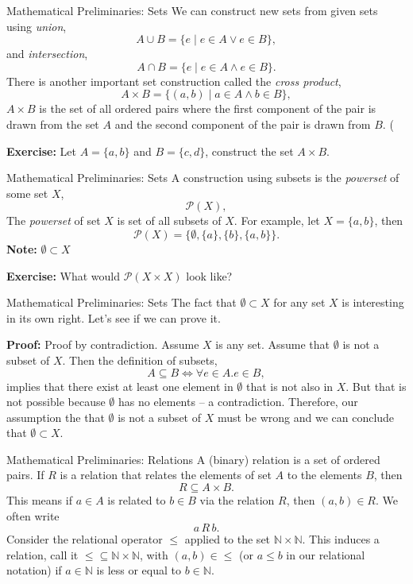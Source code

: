 \documentclass{beamer}
\begin{document}
\begin{frame}{\large Mathematical  Preliminaries: Sets}
We can construct new sets from given sets using {\em union},
\[
A \cup B = \{ e \mid e\in A \vee e \in B\},
\]
 and {\em intersection},
\[
A \cap B = \{ e \mid  e\in A \wedge e \in B\}.
\]
There is another important set construction called the {\em cross product},
\[
A\times B = \{ (a,b) \mid  a\in A \wedge b\in B\},
\]
$A\times B$ is the set of all ordered pairs where the first component of the pair is drawn from
the set $A$ and the second component of the pair is drawn from $B$. (

{\bf Exercise:} Let $A=\{a,b\}$ and $B=\{c,d\}$, construct the set $A\times B$.

\end{frame}

\begin{frame}{\large Mathematical  Preliminaries: Sets}
A construction using subsets is the {\em powerset} of some set $X$,
\[
{\mathcal P}(X),
\]
The {\em powerset} of set $X$ is set of all subsets of $X$.  For example,
let $X = \{a,b\}$, then
\[
{\mathcal P}(X) = \{ \emptyset, \{a\}, \{b\}, \{a,b\} \}.
\]
{\bf Note:} $\emptyset \subset X$

\vspace{.1in}

{\bf Exercise:} What would ${\mathcal P}(X\times X)$ look like?

\end{frame}

\begin{frame}{\large Mathematical  Preliminaries: Sets}
\scriptsize
The fact that $\emptyset \subset X$ for any set $X$ is interesting in its own right.  Let's see if we can prove it.

\vspace{.1in}

{\bf Proof:} Proof by contradiction. Assume $X$ is any set. Assume that $\emptyset$ is not a subset of $X$.
Then the definition of subsets,
\[
A \subseteq B \Leftrightarrow \forall e \in A. e \in B,
\]
implies that there exist at least one element in $\emptyset$ that is not also in $X$.  But that is not possible
because $\emptyset$ has no elements -- a contradiction.  Therefore, our assumption the
that $\emptyset$ is not a subset of $X$ must be wrong and we can conclude that $\emptyset \subset X$.

\end{frame}


\begin{frame}{\large Mathematical  Preliminaries: Relations}
A (binary) relation is a set of ordered pairs.  If $R$ is a relation that relates the elements of
set $A$ to the elements $B$, then
\[
R \subseteq A\times B.
\]
This means if $a\in A$ is related to $b\in B$ via the relation $R$, then $(a,b)\in R$.  We often
write
\[
a\, R\, b.
\]
Consider the relational operator $\le$ applied to the set ${\mathbb N}\times {\mathbb N}$.
This induces a relation, call it $\le \subseteq {\mathbb N}\times {\mathbb N}$, with
$(a,b) \in \le$ (or $a \le b$ in our relational notation) if $a\in{\mathbb N}$ is less or equal to $b\in{\mathbb N}$.
\end{frame}
\end{document}
